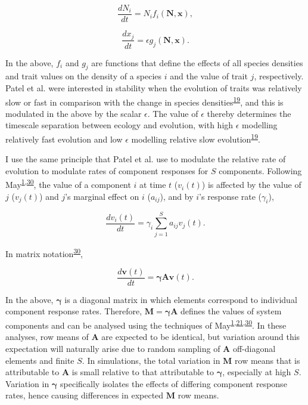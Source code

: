 \documentclass[]{article}
\begin{document}
\[\frac{dN_{i}}{dt} = N_{i}f_{i}(\mathbf{N}, \mathbf{x}),\]

\[\frac{dx_{j}}{dt} = \epsilon g_{j}(\mathbf{N}, \mathbf{x}).\]

In the above, \(f_{i}\) and \(g_{j}\) are functions that define the
effects of all species densities and trait values on the density of a
species \(i\) and the value of trait \(j\), respectively. Patel et al.
were interested in stability when the evolution of traits was relatively
slow or fast in comparison with the change in species
densities\textsuperscript{\protect\hyperlink{ref-Patel2018}{19}}, and
this is modulated in the above by the scalar \(\epsilon\). The value of
\(\epsilon\) thereby determines the timescale separation between ecology
and evolution, with high \(\epsilon\) modelling relatively fast
evolution and low \(\epsilon\) modelling relative slow
evolution\textsuperscript{\protect\hyperlink{ref-Patel2018}{19}}.

I use the same principle that Patel et al. use to modulate the relative
rate of evolution to modulate rates of component responses for \(S\)
components. Following
May\textsuperscript{\protect\hyperlink{ref-May1972}{1},\protect\hyperlink{ref-May1973}{30}},
the value of a component \(i\) at time \(t\) (\(v_{i}(t)\)) is affected
by the value of \(j\) (\(v_{j}(t)\)) and \(j\)'s marginal effect on
\(i\) (\(a_{ij}\)), and by \(i\)'s response rate (\(\gamma_{i}\)),

\[\frac{dv_{i}(t)}{dt} = \gamma_{i} \sum_{j=1}^{S}a_{ij}v_{j}(t).\]

In matrix notation\textsuperscript{\protect\hyperlink{ref-May1973}{30}},

\[\frac{d\mathbf{v}(t)}{dt} = \mathbf{\gamma} \mathbf{A}\mathbf{v}(t).\]

In the above, \(\mathbf{\gamma}\) is a diagonal matrix in which elements
correspond to individual component response rates. Therefore,
\(\mathbf{M} = \mathbf{\gamma} \mathbf{A}\) defines the values of system
components and can be analysed using the techniques of
May\textsuperscript{\protect\hyperlink{ref-May1972}{1},\protect\hyperlink{ref-Ahmadian2015}{21},\protect\hyperlink{ref-May1973}{30}}.
In these analyses, row means of \(\mathbf{A}\) are expected to be
identical, but variation around this expectation will naturally arise
due to random sampling of \(\mathbf{A}\) off-diagonal elements and
finite \(S\). In simulations, the total variation in \(\mathbf{M}\) row
means that is attributable to \(\mathbf{A}\) is small relative to that
attributable to \(\mathbf{\gamma}\), especially at high \(S\). Variation
in \(\mathbf{\gamma}\) specifically isolates the effects of differing
component response rates, hence causing differences in expected
\(\mathbf{M}\) row means.
\end{document}
